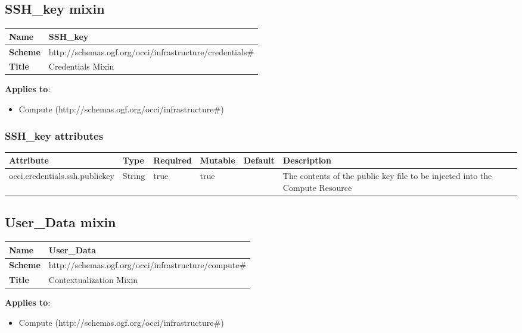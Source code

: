 \documentclass{article}
\begin{document}
\subsection{SSH\_key mixin}
\begin{center}
\begin{tabular}{|l|l|}
  \hline
  \textbf{Name} & SSH\_key \\
  \hline  
  \textbf{Scheme} & http://schemas.ogf.org/occi/infrastructure/credentials\# \\
  \hline
  \textbf{Title} & Credentials Mixin \\
  \hline
\end{tabular}
\end{center}
\textbf{Applies to}:
\begin{itemize}
	\item Compute (http://schemas.ogf.org/occi/infrastructure\#)
\end{itemize}

\subsubsection{SSH\_key attributes}
\begin{tabularx}{\textwidth}{|l|l|p{1.4cm}|p{1.3cm}|l|X|}
  \hline
  \textbf{Attribute} & \textbf{Type} & \textbf{Required} & \textbf{Mutable} & \textbf{Default} & \textbf{Description} \\
  \hline  
  occi.credentials.ssh.publickey & String & true & true &  & The contents of the public key file to be injected into the Compute Resource \\
  \hline
\end{tabularx}


\subsection{User\_Data mixin}
\begin{center}
\begin{tabular}{|l|l|}
  \hline
  \textbf{Name} & User\_Data \\
  \hline  
  \textbf{Scheme} & http://schemas.ogf.org/occi/infrastructure/compute\# \\
  \hline
  \textbf{Title} & Contextualization Mixin \\
  \hline
\end{tabular}
\end{center}
\textbf{Applies to}:
\begin{itemize}
	\item Compute (http://schemas.ogf.org/occi/infrastructure\#)
\end{itemize}
\end{document}
